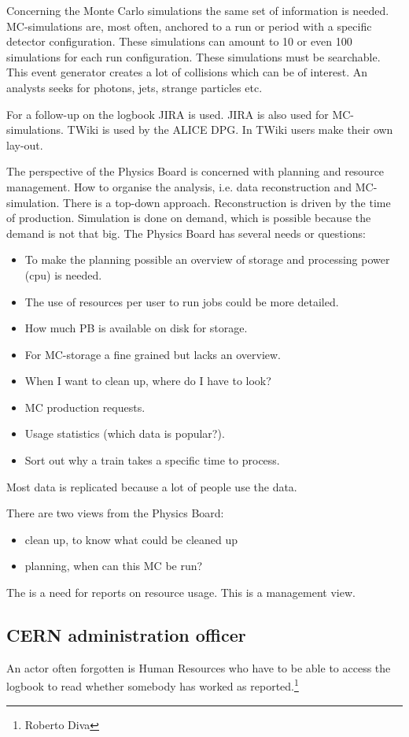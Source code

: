 Concerning the Monte Carlo simulations the same set of information is needed. MC-simulations are, most often, anchored to a run or period with a specific detector configuration. These simulations can amount to 10 or even 100 simulations for each run configuration. These simulations must be searchable. This event generator creates a lot of collisions which can be of interest. An analysts seeks for photons, jets, strange particles etc.

For a follow-up on the logbook JIRA is used. JIRA is also used for MC-simulations. TWiki is used by the ALICE DPG. In TWiki users make their own lay-out. 

The perspective of the Physics Board is concerned with planning and resource management. How to organise the analysis, i.e. data reconstruction and MC-simulation. There is a top-down approach. Reconstruction is driven by the time of production. Simulation is done on demand, which is possible because the demand is not that big. The Physics Board has several needs or questions:
\begin{itemize}
  \item To make the planning possible an overview of storage and processing power (cpu) is needed. 
  \item The use of resources per user to run jobs could be more detailed.
  \item How much PB is available on disk for storage.
  \item For MC-storage a fine grained but lacks an overview.
  \item When I want to clean up, where do I have to look?
  \item MC production requests.
  \item Usage statistics (which data is popular?).
  \item Sort out why a train takes a specific time to process.
\end{itemize}
Most data is replicated because a lot of people use the data.

There are two views from the Physics Board:
\begin{itemize}
  \item clean up, to know what could be cleaned up
  \item planning, when can this MC be run?
\end{itemize}
The is a need for reports on resource usage. This is a management view.

\subsection{CERN administration officer}
An actor often forgotten is Human Resources who have to be able to access the logbook to read whether somebody has worked as reported.\footnote{Roberto Diva}

